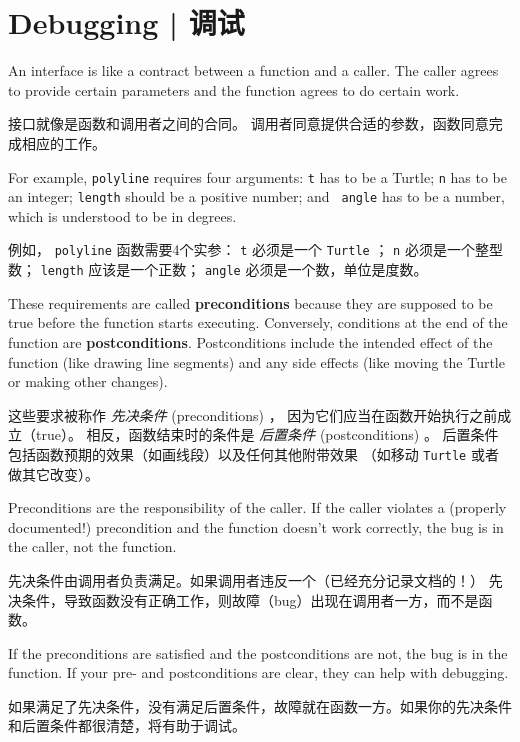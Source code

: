 \section{Debugging  |  调试}
  

An interface is like a contract between a function and a caller.
The caller agrees to provide certain parameters and the function
agrees to do certain work.

接口就像是函数和调用者之间的合同。
调用者同意提供合适的参数，函数同意完成相应的工作。

For example, {\tt polyline} requires four arguments: {\tt t} has to be
a Turtle; {\tt n} has to be an
integer; {\tt length} should be a positive number; and {\tt
  angle} has to be a number, which is understood to be in degrees.

例如， \lstinline{polyline} 函数需要4个实参： \lstinline{t} 必须是一个 \lstinline{Turtle} ；
\lstinline{n} 必须是一个整型数； \lstinline{length} 应该是一个正数；
\lstinline{angle} 必须是一个数，单位是度数。

These requirements are called {\bf preconditions} because they
are supposed to be true before the function starts executing.
Conversely, conditions at the end of the function are
{\bf postconditions}.  Postconditions include the intended
effect of the function (like drawing line segments) and any
side effects (like moving the Turtle or making other changes).

这些要求被称作 \emph{先决条件} (preconditions) ，
因为它们应当在函数开始执行之前成立（true）。
相反，函数结束时的条件是 \emph{后置条件} (postconditions) 。
后置条件包括函数预期的效果（如画线段）以及任何其他附带效果
（如移动 \lstinline{Turtle} 或者做其它改变）。
  

Preconditions are the responsibility of the caller.  If the caller
violates a (properly documented!) precondition and the function
doesn't work correctly, the bug is in the caller, not the function.

先决条件由调用者负责满足。如果调用者违反一个（已经充分记录文档的！）
先决条件，导致函数没有正确工作，则故障（bug）出现在调用者一方，而不是函数。

If the preconditions are satisfied and the postconditions are
not, the bug is in the function.  If your pre- and postconditions
are clear, they can help with debugging.

如果满足了先决条件，没有满足后置条件，故障就在函数一方。如果你的先决条件和后置条件都很清楚，将有助于调试。


